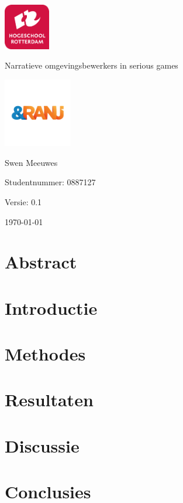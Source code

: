 \documentclass{report}
\newcommand{\versionnumber}{0.1}
\newcommand{\name}{Swen Meeuwes}
\newcommand{\studentnumber}{0887127}
\renewcommand{\title}{Narratieve omgevingsbewerkers in serious games}
\newcommand{\subtitle}{}
\begin{document}
\begin{titlepage}
        \centering
        \includegraphics[width=2cm]{University}\par
        \vspace{4\baselineskip}
        {\Huge\title\par}
        {\Large\subtitle\par}
        \par
        \includegraphics[width=3cm]{Organisation}
        \vspace{4\baselineskip}
        \par
        {\Large\name\par}
        {Studentnummer: \studentnumber\par}
        \vfill
        {\hfill Versie: \versionnumber\par}
        {\hfill \today}
\end{titlepage}

\chapter*{Abstract}

\tableofcontents

\chapter{Introductie}


\chapter{Methodes}


\chapter{Resultaten}


\chapter{Discussie}


\chapter{Conclusies}
\end{document}
